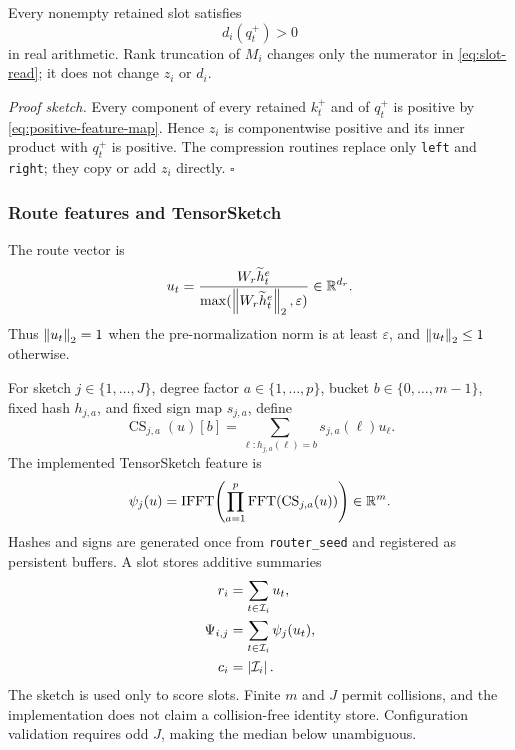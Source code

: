 \begin{proposition}
\label{prop:positive-denominator}
Every nonempty retained slot satisfies
\begin{equation}
  d_i(q_t^+)>0
\end{equation}
in real arithmetic.  Rank truncation of \(M_i\) changes only the numerator in
\eqref{eq:slot-read}; it does not change \(z_i\) or \(d_i\).
\end{proposition}
\noindent\emph{Proof sketch.}
Every component of every retained \(k_t^+\) and of \(q_t^+\) is positive by
\eqref{eq:positive-feature-map}.  Hence \(z_i\) is componentwise positive and
its inner product with \(q_t^+\) is positive.  The compression routines replace
only \texttt{left} and \texttt{right}; they copy or add \(z_i\) directly.
\hfill\(\square\)

\subsubsection{Route features and TensorSketch}

The route vector is
\begin{equation}
  u_t
  =
  \frac{W_r\widetilde h_t^e}
       {\max(\left\lVert W_r\widetilde h_t^e\right\rVert_2,\varepsilon)}
  \in\mathbb{R}^{d_r}.
  \label{eq:route-vector}
\end{equation}
Thus \(\left\lVert u_t\right\rVert_2=1\) when the pre-normalization norm is at least
\(\varepsilon\), and \(\left\lVert u_t\right\rVert_2\leq 1\) otherwise.

For sketch \(j\in\{1,\ldots,J\}\), degree factor
\(a\in\{1,\ldots,p\}\), bucket \(b\in\{0,\ldots,m-1\}\), fixed hash
\(h_{j,a}\), and fixed sign map \(s_{j,a}\), define
\begin{equation}
  \operatorname{CS}_{j,a}(u)[b]
  =
  \sum_{\ell:h_{j,a}(\ell)=b}
  s_{j,a}(\ell)u_\ell .
  \label{eq:count-sketch}
\end{equation}
The implemented TensorSketch feature is
\begin{equation}
  \psi_j(u)
  =
  \operatorname{IFFT}\!\left(
    \prod_{a=1}^{p}
    \operatorname{FFT}(
      \operatorname{CS}_{j,a}(u)
    )
  \right)
  \in\mathbb{R}^m.
  \label{eq:tensor-sketch}
\end{equation}
Hashes and signs are generated once from \texttt{router\_seed} and registered
as persistent buffers.  A slot stores additive summaries
\begin{align}
  r_i&=\sum_{t\in\mathcal I_i}u_t, \\
  \Psi_{i,j}
    &=\sum_{t\in\mathcal I_i}\psi_j(u_t), \\
  c_i&=\left\lvert \mathcal I_i\right\rvert.
  \label{eq:route-summaries}
\end{align}
The sketch is used only to score slots.  Finite \(m\) and \(J\) permit
collisions, and the implementation does not claim a collision-free identity
store.  Configuration validation requires odd \(J\), making the median below
unambiguous.

